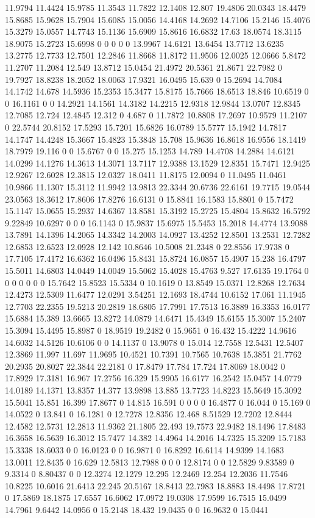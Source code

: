 11.9794 11.4424 15.9785 11.3543 11.7822 12.1408 12.807 19.4806 20.0343 18.4479 15.8685 15.9628 15.7904 15.6085 15.0056 14.4168 14.2692 14.7106 15.2146 15.4076 15.3279 15.0557 14.7743 15.1136 15.6909 15.8616 16.6832 17.63 18.0574 18.3115 18.9075 15.2723 15.6998 0 0 0 0 0 13.9967 14.6121 13.6454 13.7712 13.6235 13.2775 12.7733 12.7501 12.2846 11.8668 11.8172 11.9506 12.0025 12.0666 5.8472 11.2707 11.2084 12.549 13.8712 15.0454 21.4972 20.5361 21.8671 22.7982 0 19.7927 18.8238 18.2052 18.0063 17.9321 16.0495 15.639 0 15.2694 14.7084 14.1742 14.678 14.5936 15.2353 15.3477 15.8175 15.7666 18.6513 18.846 10.6519 0 0 16.1161 0 0 14.2921 14.1561 14.3182 14.2215 12.9318 12.9844 13.0707 12.8345 12.7085 12.724 12.4845 12.312 0 4.687 0 11.7872 10.8808 17.2697 10.9579 11.2107 0 22.5744 20.8152 17.5293 15.7201 15.6826 16.0789 15.5777 15.1942 14.7817 14.1747 14.4248 15.3667 15.4823 15.3848 15.708 15.9636 16.8618 16.9556 18.1419 18.7979 19.116 0 0 15.6767 0 0 15.275 15.1253 14.789 14.4708 14.2884 14.6121 14.0299 14.1276 14.3613 14.3071 13.7117 12.9388 13.1529 12.8351 15.7471 12.9425 12.9267 12.6028 12.3815 12.0327 18.0411 11.8175 12.0094 0 11.0495 11.0461 10.9866 11.1307 15.3112 11.9942 13.9813 22.3344 20.6736 22.6161 19.7715 19.0544 23.0563 18.3612 17.8606 17.8276 16.6131 0 15.8841 16.1583 15.8801 0 15.7472 15.1147 15.0655 15.2937 14.6367 13.8581 15.3192 15.2725 15.4804 15.8632 16.5792 9.22849 10.6297 0 0 0 16.1143 0 15.9837 15.6975 15.5453 15.2018 14.4774 13.9088 13.7891 14.1396 14.2065 14.3342 14.2003 14.0927 13.4252 12.8501 13.2531 12.7282 12.6853 12.6523 12.0928 12.142 10.8646 10.5008 21.2348 0 22.8556 17.9738 0 17.7105 17.4172 16.6362 16.0496 15.8431 15.8724 16.0857 15.4907 15.238 16.4797 15.5011 14.6803 14.0449 14.0049 15.5062 15.4028 15.4763 9.527 17.6135 19.1764 0 0 0 0 0 0 0 15.7642 15.8523 15.5334 0 10.1619 0 13.8549 15.0371 12.8268 12.7634 12.4273 12.5309 11.6477 12.0291 3.54251 12.1693 18.4744 10.6152 17.061 11.1945 12.7703 22.2355 19.5213 20.2819 18.6805 17.7991 17.7513 16.3889 16.3353 16.0177 15.6884 15.389 13.6665 13.8272 14.0879 14.6471 15.4349 15.6155 15.3007 15.2407 15.3094 15.4495 15.8987 0 18.9519 19.2482 0 15.9651 0 16.432 15.4222 14.9616 14.6032 14.5126 10.6106 0 0 14.1137 0 13.9078 0 15.014 12.7558 12.5431 12.5407 12.3869 11.997 11.697 11.9695 10.4521 10.7391 10.7565 10.7638 15.3851 21.7762 20.2935 20.8027 22.3844 22.2181 0 17.8479 17.784 17.724 17.8069 18.0042 0 17.8929 17.3181 16.967 17.2756 16.329 15.9905 16.6177 16.2542 15.0457 14.0779 14.0189 14.1371 13.8357 14.377 13.9898 13.885 13.7723 14.8223 15.5649 15.3092 15.5041 15.851 16.399 17.8677 0 14.815 16.591 0 0 0 0 16.4877 0 16.044 0 15.169 0 14.0522 0 13.841 0 16.1281 0 12.7278 12.8356 12.468 8.51529 12.7202 12.8444 12.4582 12.5731 12.2813 11.9362 21.1805 22.493 19.7573 22.9482 18.1496 17.8483 16.3658 16.5639 16.3012 15.7477 14.382 14.4964 14.2016 14.7325 15.3209 15.7183 15.3338 18.6033 0 0 16.0123 0 0 16.9871 0 16.8292 16.6114 14.9399 14.1683 13.0011 12.8435 0 16.629 12.5813 12.7988 0 0 0 12.8174 0 0 12.5829 9.83589 0 9.3314 0 8.80437 0 0 12.3274 12.1279 12.295 12.2469 12.254 12.2036 11.7546 10.8225 10.6016 21.6413 22.245 20.5167 18.8413 22.7983 18.8883 18.4498 17.8721 0 17.5869 18.1875 17.6557 16.6062 17.0972 19.0308 17.9599 16.7515 15.0499 14.7961 9.6442 14.0956 0 15.2148 18.432 19.0435 0 0 16.9632 0 15.0441 